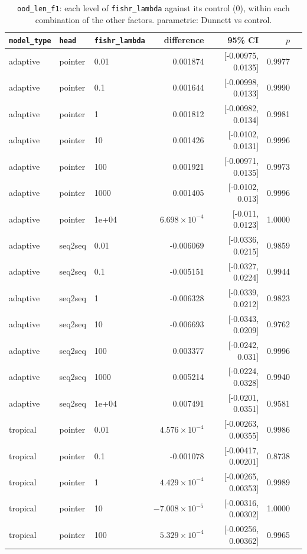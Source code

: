 \documentclass[10pt]{article}
\begin{document}
{\small
\begin{longtable}{lllrrrl}
\caption{\texttt{ood\_len\_f1}: each level of \texttt{fishr\_lambda} against its control (0), within each combination of the other factors. parametric: Dunnett vs control.}\label{tab:control-ood_len_f1}\\
\toprule
\texttt{model\_type} & \texttt{head} & \texttt{fishr\_lambda} & difference & 95\% CI & $p$ & \\
\midrule
\endhead
adaptive & pointer & 0.01 & 0.001874 & [-0.00975, 0.0135] & 0.9977 & \\
adaptive & pointer & 0.1 & 0.001644 & [-0.00998, 0.0133] & 0.9990 & \\
adaptive & pointer & 1 & 0.001812 & [-0.00982, 0.0134] & 0.9981 & \\
adaptive & pointer & 10 & 0.001426 & [-0.0102, 0.0131] & 0.9996 & \\
adaptive & pointer & 100 & 0.001921 & [-0.00971, 0.0135] & 0.9973 & \\
adaptive & pointer & 1000 & 0.001405 & [-0.0102, 0.013] & 0.9996 & \\
adaptive & pointer & 1e+04 & $6.698\times10^{-4}$ & [-0.011, 0.0123] & 1.0000 & \\
adaptive & seq2seq & 0.01 & -0.006069 & [-0.0336, 0.0215] & 0.9859 & \\
adaptive & seq2seq & 0.1 & -0.005151 & [-0.0327, 0.0224] & 0.9944 & \\
adaptive & seq2seq & 1 & -0.006328 & [-0.0339, 0.0212] & 0.9823 & \\
adaptive & seq2seq & 10 & -0.006693 & [-0.0343, 0.0209] & 0.9762 & \\
adaptive & seq2seq & 100 & 0.003377 & [-0.0242, 0.031] & 0.9996 & \\
adaptive & seq2seq & 1000 & 0.005214 & [-0.0224, 0.0328] & 0.9940 & \\
adaptive & seq2seq & 1e+04 & 0.007491 & [-0.0201, 0.0351] & 0.9581 & \\
tropical & pointer & 0.01 & $4.576\times10^{-4}$ & [-0.00263, 0.00355] & 0.9986 & \\
tropical & pointer & 0.1 & -0.001078 & [-0.00417, 0.00201] & 0.8738 & \\
tropical & pointer & 1 & $4.429\times10^{-4}$ & [-0.00265, 0.00353] & 0.9989 & \\
tropical & pointer & 10 & $-7.008\times10^{-5}$ & [-0.00316, 0.00302] & 1.0000 & \\
tropical & pointer & 100 & $5.329\times10^{-4}$ & [-0.00256, 0.00362] & 0.9965 & \\

\end{longtable}}
\end{document}
